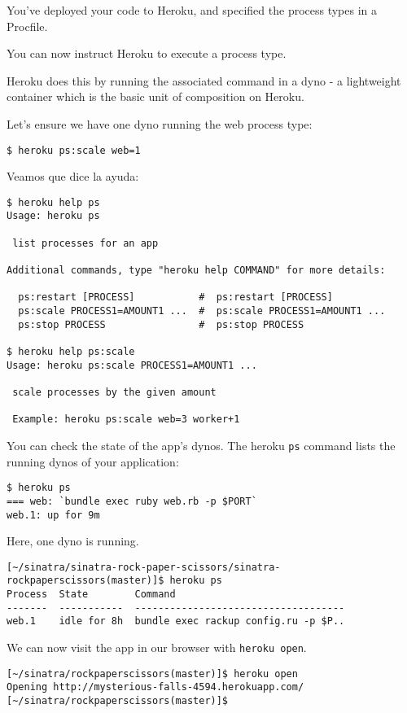 
You’ve deployed your code to Heroku, and specified the process types
in a Procfile. 

You can now instruct Heroku to execute a process
type. 

Heroku does this by running the associated command in a dyno
- a lightweight container which is the basic unit of composition
on Heroku.

Let’s ensure we have one dyno running the web process type:
\begin{verbatim}
$ heroku ps:scale web=1
\end{verbatim}
Veamos que dice la ayuda:
\begin{verbatim}
$ heroku help ps
Usage: heroku ps

 list processes for an app

Additional commands, type "heroku help COMMAND" for more details:

  ps:restart [PROCESS]           #  ps:restart [PROCESS]
  ps:scale PROCESS1=AMOUNT1 ...  #  ps:scale PROCESS1=AMOUNT1 ...
  ps:stop PROCESS                #  ps:stop PROCESS

$ heroku help ps:scale
Usage: heroku ps:scale PROCESS1=AMOUNT1 ...

 scale processes by the given amount

 Example: heroku ps:scale web=3 worker+1
\end{verbatim}

You can check the state of the app’s dynos. 
The heroku \verb|ps| command lists the running dynos of your application:
\begin{verbatim}
$ heroku ps
=== web: `bundle exec ruby web.rb -p $PORT`
web.1: up for 9m
\end{verbatim}
Here, one dyno is running.
\begin{verbatim}
[~/sinatra/sinatra-rock-paper-scissors/sinatra-rockpaperscissors(master)]$ heroku ps
Process  State        Command                               
-------  -----------  ------------------------------------  
web.1    idle for 8h  bundle exec rackup config.ru -p $P..  
\end{verbatim}

We can now visit the app in our browser with \verb|heroku open|.
\begin{verbatim}
[~/sinatra/rockpaperscissors(master)]$ heroku open
Opening http://mysterious-falls-4594.herokuapp.com/
[~/sinatra/rockpaperscissors(master)]$ 
\end{verbatim}


